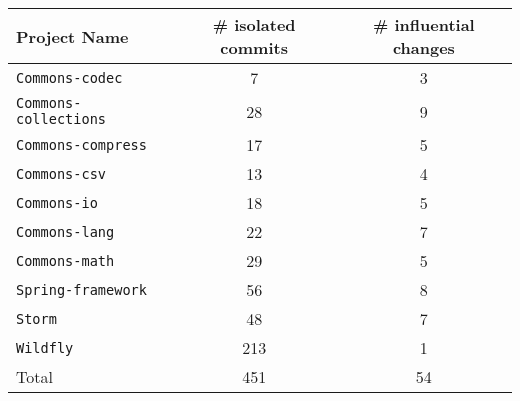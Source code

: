 \centering
\resizebox{0.6\linewidth}{!}
{
\begin{tabular}{lcc}
    Project Name & \# isolated commits & \# influential changes\\
\toprule

{\tt Commons-codec} & 7 & 3 \\
{\tt Commons-collections} & 28 & 9 \\
{\tt Commons-compress} & 17 & 5 \\
{\tt Commons-csv} & 13 & 4 \\
{\tt Commons-io} & 18 & 5 \\
{\tt Commons-lang} & 22 & 7 \\
{\tt Commons-math} & 29 & 5 \\
{\tt Spring-framework} & 56 & 8 \\
{\tt Storm} & 48 & 7 \\
{\tt Wildfly} & 213 & 1 \\
\midrule
Total & 451 & 54 \\
\bottomrule

\end{tabular}
}
